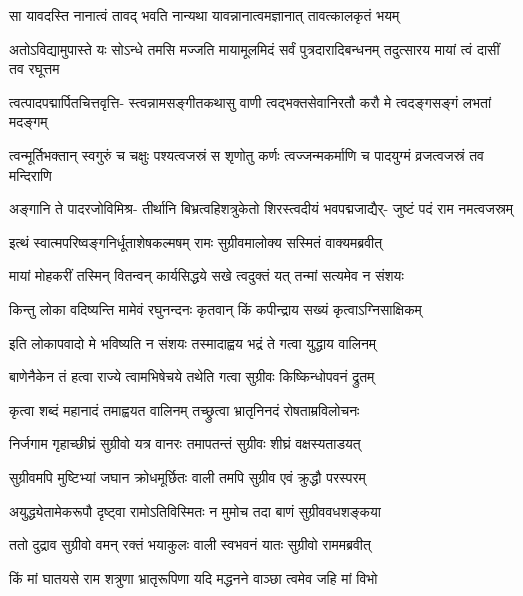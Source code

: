 \twolineshloka
{सा यावदस्ति नानात्वं तावद् भवति नान्यथा}
{यावन्नानात्वमज्ञानात् तावत्कालकृतं भयम्} %

\threelineshloka
{अतोऽविद्यामुपास्ते यः सोऽन्धे तमसि मज्जति}
{मायामूलमिदं सर्वं पुत्रदारादिबन्धनम्}
{तदुत्सारय मायां त्वं दासीं तव रघूत्तम} %

\fourlineindentedshloka
{त्वत्पादपद्मार्पितचित्तवृत्ति-}
{स्त्वन्नामसङ्गीतकथासु वाणी}
{त्वद्भक्तसेवानिरतौ करौ मे}
{त्वदङ्गसङ्गं लभतां मदङ्गम्} %

\fourlineindentedshloka
{त्वन्मूर्तिभक्तान् स्वगुरुं च चक्षुः}
{पश्यत्वजस्रं स शृणोतु कर्णः}
{त्वज्जन्मकर्माणि च पादयुग्मं}
{व्रजत्वजस्रं तव मन्दिराणि} %

\fourlineindentedshloka
{अङ्गानि ते पादरजोविमिश्र-}
{तीर्थानि बिभ्रत्वहिशत्रुकेतो}
{शिरस्त्वदीयं भवपद्मजाद्यैर्-}
{जुष्टं पदं राम नमत्वजस्रम्} %





\twolineshloka
{इत्थं स्वात्मपरिष्वङ्गनिर्धूताशेषकल्मषम्}
{रामः सुग्रीवमालोक्य सस्मितं वाक्यमब्रवीत्} %

\twolineshloka
{मायां मोहकरीं तस्मिन् वितन्वन् कार्यसिद्धये}
{सखे त्वदुक्तं यत् तन्मां सत्यमेव न संशयः} %

\twolineshloka
{किन्तु लोका वदिष्यन्ति मामेवं रघुनन्दनः}
{कृतवान् किं कपीन्द्राय सख्यं कृत्वाऽग्निसाक्षिकम्} %

\twolineshloka
{इति लोकापवादो मे भविष्यति न संशयः}
{तस्मादाह्वय भद्रं ते गत्वा युद्धाय वालिनम्} %

\twolineshloka
{बाणेनैकेन तं हत्वा राज्ये त्वामभिषेचये}
{तथेति गत्वा सुग्रीवः किष्किन्धोपवनं द्रुतम्} %

\twolineshloka
{कृत्वा शब्दं महानादं तमाह्वयत वालिनम्}
{तच्छ्रुत्वा भ्रातृनिनदं रोषताम्रविलोचनः} %

\twolineshloka
{निर्जगाम गृहाच्छीघ्रं सुग्रीवो यत्र वानरः}
{तमापतन्तं सुग्रीवः शीघ्रं वक्षस्यताडयत्} %

\twolineshloka
{सुग्रीवमपि मुष्टिभ्यां जघान क्रोधमूर्छितः}
{वाली तमपि सुग्रीव एवं क्रुद्धौ परस्परम्} %

\twolineshloka
{अयुद्ध्येतामेकरूपौ दृष्ट्वा रामोऽतिविस्मितः}
{न मुमोच तदा बाणं सुग्रीववधशङ्कया} %

\twolineshloka
{ततो दुद्राव सुग्रीवो वमन् रक्तं भयाकुलः}
{वाली स्वभवनं यातः सुग्रीवो राममब्रवीत्} %

\twolineshloka
{किं मां घातयसे राम शत्रुणा भ्रातृरूपिणा}
{यदि मद्धनने वाञ्छा त्वमेव जहि मां विभो} %

